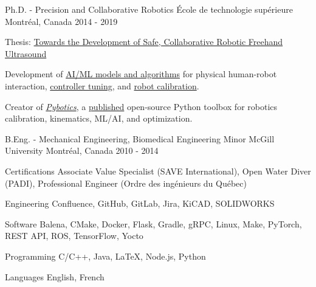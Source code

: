 \documentclass[11pt, letterpaper]{awesome-cv}
\begin{document}
\begin{cventries}
    \cventry
    {Ph.D. - Precision and Collaborative Robotics}
    {École de technologie supérieure}
    {Montréal, Canada}
    {2014 - 2019}
    {
        \begin{cvitems}
            \item{Thesis: \href{https://www.nicholasnadeau.com/publication/nadeau-2019-towards/}{Towards the Development of Safe, Collaborative Robotic Freehand Ultrasound}}
            \item{Development of \href{https://www.nicholasnadeau.com/talk/hardware-in-the-loop-training-robot-contact-in-an-unstructured-environment/}{AI/ML models and algorithms} for physical human-robot interaction, \href{https://www.nicholasnadeau.com/publication/nadeau-2018-evolutionary/}{controller tuning}, and \href{https://www.nicholasnadeau.com/publication/nadeau-2019-impedance/}{robot calibration}.}
            \item{Creator of \href{https://github.com/EngNadeau/pybotics}{\textit{Pybotics}}, a \href{https://joss.theoj.org/papers/10.21105/joss.01738}{published} open-source Python toolbox for robotics calibration, kinematics, ML/AI, and optimization.}
        \end{cvitems}
    }

    \cventry
    {B.Eng. - Mechanical Engineering, Biomedical Engineering Minor}
    {McGill University}
    {Montréal, Canada}
    {2010 - 2014}
    {
        \begin{cvitems}
        \end{cvitems}
    }
\end{cventries}

\begin{cvskills}
    \cvskill
    {Certifications}
    {
        Associate Value Specialist (SAVE International),
        Open Water Diver (PADI),
        Professional Engineer (Ordre des ingénieurs du Québec)
    }

    \cvskill
    {Engineering}
    {
        Confluence,
        GitHub,
        GitLab,
        Jira,
        KiCAD,
        SOLIDWORKS
    }

    \cvskill
    {Software}
    {
        Balena,
        CMake,
        Docker,
        Flask,
        Gradle,
        gRPC,
        Linux,
        Make,
        PyTorch,
        REST API,
        ROS,
        TensorFlow,
        Yocto
    }

    \cvskill
    {Programming}
    {
        C/C++,
        Java,
        LaTeX,
        Node.js,
        Python
    }

    \cvskill
    {Languages}
    {
        English,
        French
    }
\end{cvskills}
\end{document}
